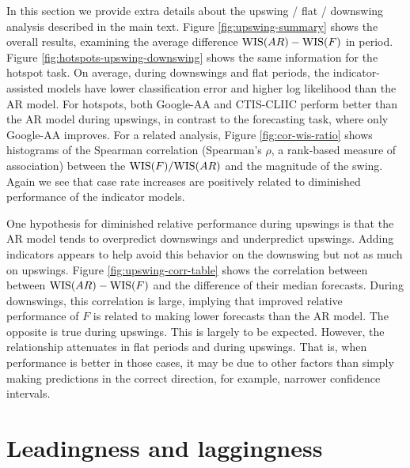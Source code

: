 In this section we provide extra details about the upswing / flat / downswing 
analysis described in the main text. Figure \ref{fig:upswing-summary} shows
the overall results, examining the average difference $\mathrm{WIS}(AR) - \mathrm{WIS}(F)$ in 
period. Figure \ref{fig:hotspots-upswing-downswing} shows the same information
for the hotspot task. On average, during downswings and flat periods, the 
indicator-assisted models have lower classification error and higher 
log likelihood than the AR model. For hotspots, both Google-AA and CTIS-CLIIC
perform better than the AR model during upswings, in contrast to the forecasting
task, where only Google-AA improves. For a related analysis, Figure 
\ref{fig:cor-wis-ratio} shows histograms of the Spearman
correlation (Spearman's $\rho$, a rank-based measure of association) between
the $\mathrm{WIS}(F)/\mathrm{WIS}(AR)$ and the magnitude of the swing. Again we see that case
rate increases are positively related to diminished performance of the 
indicator models.

One hypothesis for diminished relative performance during upswings is that 
the AR model tends to overpredict downswings and underpredict upswings. Adding
indicators appears to help avoid this behavior on the downswing but not as much 
on upswings. Figure \ref{fig:upswing-corr-table} shows the correlation between
between $\mathrm{WIS}(AR) - \mathrm{WIS}(F)$ and the difference of their median forecasts.
During 
downswings, this correlation is large, implying that improved relative
performance 
of $F$ is related to making lower forecasts than the AR model. The opposite is
true during upswings. This is largely to be expected. However, the relationship
attenuates in flat periods and during upswings. That is, when performance is
better 
in those cases, it may be due to other factors than simply making predictions
in the correct direction, for example, narrower confidence intervals.


\section{Leadingness and laggingness}


